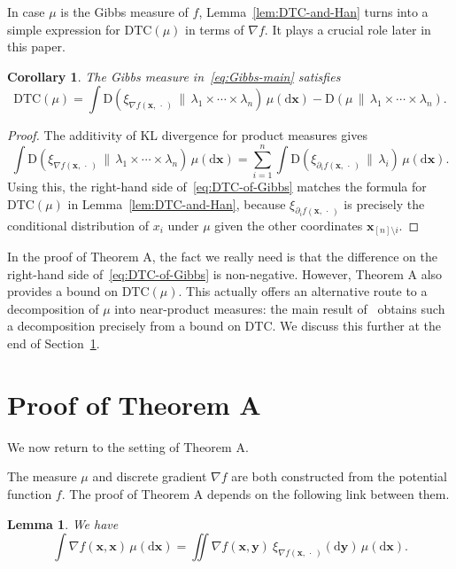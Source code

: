 \documentclass[aop,preprint]{imsart}
\newtheorem{lem}[thm]{Lemma}
\newtheorem{cor}[thm]{Corollary}
\theoremstyle{remark}
\renewcommand{\bf}[1]{\boldsymbol{#1}}
\renewcommand{\d}{\mathrm{d}}
\renewcommand{\l}{\lambda}
\newcommand{\DTC}{\mathrm{DTC}}
\newcommand{\rmD}{\mathrm{D}}
\begin{document}
In case $\mu$ is the Gibbs measure of $f$, Lemma~\ref{lem:DTC-and-Han} turns into a simple expression for $\DTC(\mu)$ in terms of $\nabla f$.  It plays a crucial role later in this paper.

\begin{cor}\label{cor:DTC-of-Gibbs}
The Gibbs measure in~\eqref{eq:Gibbs-main} satisfies
\begin{equation}\label{eq:DTC-of-Gibbs}
\DTC(\mu) = \int \rmD(\xi_{\nabla f(\bf{x},\,\cdot\,)}\,\|\,\l_1\times \cdots \times \l_n)\,\mu(\d \bf{x}) - \rmD(\mu\,\|\,\l_1\times \cdots \times \l_n).
\end{equation}
\end{cor}

\begin{proof}
The additivity of KL divergence for product measures gives
\[\int \rmD(\xi_{\nabla f(\bf{x},\,\cdot\,)}\,\|\,\l_1\times \cdots \times \l_n)\,\mu(\d \bf{x}) = \sum_{i=1}^n \int \rmD(\xi_{\partial_i f(\bf{x},\,\cdot\,)}\,\|\,\l_i)\,\mu(\d \bf{x}).\]
Using this, the right-hand side of~\eqref{eq:DTC-of-Gibbs} matches the formula for $\DTC(\mu)$ in Lemma~\ref{lem:DTC-and-Han}, because $\xi_{\partial_i f(\bf{x},\,\cdot\,)}$ is precisely the conditional distribution of $x_i$ under $\mu$ given the other coordinates $\bf{x}_{[n]\setminus i}$.
	\end{proof}

In the proof of Theorem A, the fact we really need is that the difference on the right-hand side of~\eqref{eq:DTC-of-Gibbs} is non-negative.  However, Theorem A also provides a bound on $\DTC(\mu)$.  This actually offers an alternative route to a decomposition of $\mu$ into near-product measures: the main result of~\cite{Aus--TC+DTC} obtains such a decomposition precisely from a bound on $\DTC$.  We discuss this further at the end of Section~\ref{sec:A-proof}.





\section{Proof of Theorem A}\label{sec:A-proof}

We now return to the setting of Theorem A.

The measure $\mu$ and discrete gradient $\nabla f$ are both constructed from the potential function $f$.  The proof of Theorem A depends on the following link between them.

\begin{lem}\label{lem:integrals-equal}
	We have
	\[\int \nabla f(\bf{x},\bf{x})\,\mu(\d \bf{x}) = \iint \nabla f(\bf{x},\bf{y})\ \xi_{\nabla f(\bf{x},\,\cdot\,)}(\d \bf{y})\,\mu(\d \bf{x}).\]
	\end{lem}
\end{document}
